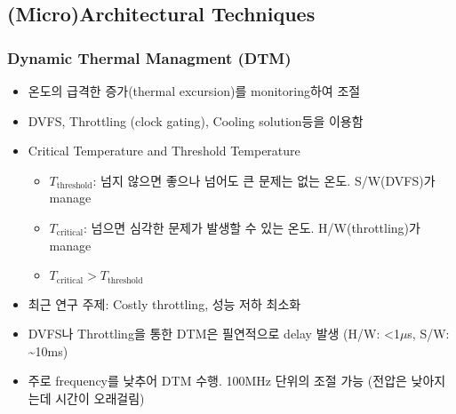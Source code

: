 \subsection{(Micro)Architectural Techniques}

\subsubsection*{Dynamic Thermal Managment (DTM)}
\begin{itemize}
    \item 온도의 급격한 증가(thermal excursion)를 monitoring하여 조절
    \item DVFS, Throttling (clock gating), Cooling solution등을 이용함
    \item Critical Temperature and Threshold Temperature
    \begin{itemize}
        \item $T_{\mathrm{threshold}}$: 넘지 않으면 좋으나 넘어도 큰 문제는 없는 온도. S/W(DVFS)가 manage
        \item $T_{\mathrm{critical}}$: 넘으면 심각한 문제가 발생할 수 있는 온도. H/W(throttling)가 manage
        \item $T_{\mathrm{critical}} > T_{\mathrm{threshold}}$
    \end{itemize}
    \item 최근 연구 주제: Costly throttling, 성능 저하 최소화
    \item DVFS나 Throttling을 통한 DTM은 필연적으로 delay 발생 (H/W: \textless 1$\mu$s, S/W: \textasciitilde 10ms)
    \begin{figures}
    \end{figures}
    \item 주로 frequency를 낮추어 DTM 수행. 100MHz 단위의 조절 가능 (전압은 낮아지는데 시간이 오래걸림)
\end{itemize}

